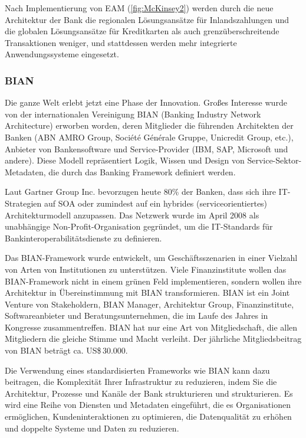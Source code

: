 \documentclass[
	doc,
	a4paper,
	helv
	]{apa6}
\begin{document}
Nach Implementierung von EAM (\autoref{fig:McKinsey2}) werden durch die neue Architektur der Bank die regionalen Lösungsansätze für Inlandszahlungen und die globalen Lösungsansätze für Kreditkarten als auch grenzüberschreitende Transaktionen weniger, und  stattdessen werden mehr integrierte Anwendungssysteme eingesetzt.

\subsubsection{BIAN}

Die ganze Welt erlebt jetzt eine Phase der Innovation. Großes Interesse wurde von der internationalen Vereinigung BIAN (Banking Industry Network Architecture) erworben worden, deren Mitglieder die führenden Architekten der Banken (ABN AMRO Group, Société Générale Gruppe, Unicredit Group, etc.), Anbieter von Bankensoftware und Service-Provider (IBM, SAP, Microsoft und andere). Diese Modell repräsentiert Logik, Wissen und Design von Service-Sektor-Metadaten, die durch das Banking Framework definiert werden.
 
Laut Gartner Group Inc. bevorzugen heute 80\% der Banken, dass sich ihre IT-Strategien auf SOA oder zumindest auf ein hybrides (serviceorientiertes) Architekturmodell anzupassen. Das Netzwerk wurde im April 2008 als unabhängige Non-Profit-Organisation gegründet, um die IT-Standards für Bankinteroperabilitätsdienste zu definieren.

Das BIAN-Framework wurde entwickelt, um Geschäftsszenarien in einer Vielzahl von Arten von Institutionen zu unterstützen. Viele Finanzinstitute wollen das BIAN-Framework nicht in einem grünen Feld implementieren, sondern wollen ihre Architektur in Übereinstimmung mit BIAN transformieren. BIAN ist ein Joint Venture von Stakeholdern,  BIAN Manager, Architektur Group, Finanzinstitute, Softwareanbieter und Beratungsunternehmen, die im Laufe des Jahres in Kongresse zusammentreffen. BIAN hat nur eine Art von Mitgliedschaft, die allen Mitgliedern die gleiche Stimme und Macht verleiht. Der jährliche Mitgliedsbeitrag von BIAN beträgt ca. US\$\,30.000.

Die Verwendung eines standardisierten Frameworks wie BIAN kann dazu beitragen, die Komplexität Ihrer Infrastruktur zu reduzieren, indem Sie die Architektur, Prozesse und Kanäle der Bank strukturieren und strukturieren. Es wird eine Reihe von Diensten und Metadaten eingeführt, die es Organisationen ermöglichen, Kundeninteraktionen zu optimieren, die Datenqualität zu erhöhen und doppelte Systeme und Daten zu reduzieren.
\end{document}
